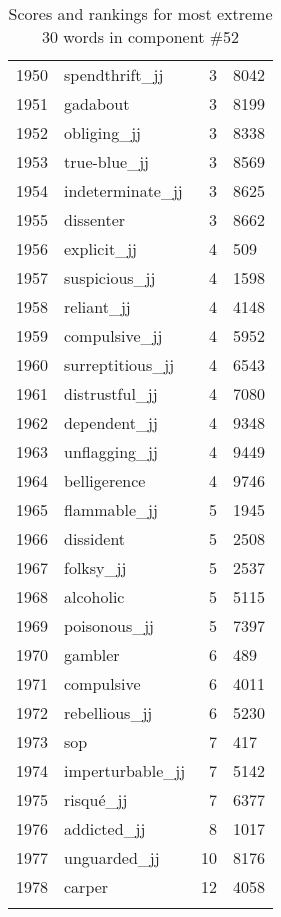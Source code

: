 \begin{longtable}[!htbp]{| rlr@{.}l |}
    1950 & spendthrift\_jj & 3 & 8042 \\
    1951 & gadabout & 3 & 8199 \\
    1952 & obliging\_jj & 3 & 8338 \\
    1953 & true-blue\_jj & 3 & 8569 \\
    1954 & indeterminate\_jj & 3 & 8625 \\
    1955 & dissenter & 3 & 8662 \\
    1956 & explicit\_jj & 4 & 509 \\
    1957 & suspicious\_jj & 4 & 1598 \\
    1958 & reliant\_jj & 4 & 4148 \\
    1959 & compulsive\_jj & 4 & 5952 \\
    1960 & surreptitious\_jj & 4 & 6543 \\
    1961 & distrustful\_jj & 4 & 7080 \\
    1962 & dependent\_jj & 4 & 9348 \\
    1963 & unflagging\_jj & 4 & 9449 \\
    1964 & belligerence & 4 & 9746 \\
    1965 & flammable\_jj & 5 & 1945 \\
    1966 & dissident & 5 & 2508 \\
    1967 & folksy\_jj & 5 & 2537 \\
    1968 & alcoholic & 5 & 5115 \\
    1969 & poisonous\_jj & 5 & 7397 \\
    1970 & gambler & 6 & 489 \\
    1971 & compulsive & 6 & 4011 \\
    1972 & rebellious\_jj & 6 & 5230 \\
    1973 & sop & 7 & 417 \\
    1974 & imperturbable\_jj & 7 & 5142 \\
    1975 & risqué\_jj & 7 & 6377 \\
    1976 & addicted\_jj & 8 & 1017 \\
    1977 & unguarded\_jj & 10 & 8176 \\
    1978 & carper & 12 & 4058 \\
    \hline
    \caption{Scores and rankings for most extreme 30 words in component \#52} \\
\end{longtable}
